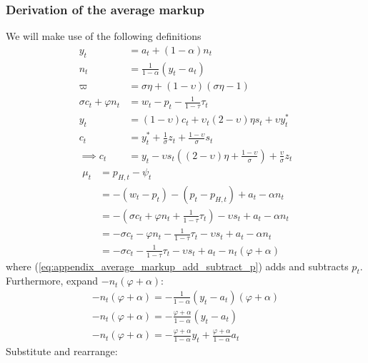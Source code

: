 \subsubsection*{Derivation of the average markup}
We will make use of the following definitions
\begin{align}\label{eq:appendix_average_markup_beginning}
    y_t &= a_t + (1-\alpha)n_t\\
    n_t &= \frac{1}{1-\alpha}(y_t - a_t)\\
    \varpi &= \sigma \eta + (1-\upsilon)(\sigma \eta - 1)\\
    \sigma c_t + \varphi n_t &= w_t - p_t - \frac{1}{1-\tau}\tau_t\\
    y_t &= (1-\upsilon)c_t + \upsilon_t(2-\upsilon)\eta s_t + \upsilon y_t^*\\
    c_t &= y_t^* + \frac{1}{\sigma}z_t + \frac{1-\upsilon}{\sigma}s_t\\
    \implies c_t &= y_t - \upsilon s_t \left( (2-\upsilon)\eta + \frac{1-\upsilon}{\sigma}\right) + \frac{\upsilon}{\sigma}z_t
\end{align}
\begin{align}
    \mu_t &= p_{H,t} - \psi_t\\
    &=-(w_t-p_t) - (p_t - p_{H,t}) + a_t - \alpha n_t \label{eq:appendix_average_markup_add_subtract_p}\\
    &= -(\sigma c_t + \varphi n_t + \frac{1}{1-\tau}\tau_t) - \upsilon s_t + a_t - \alpha n_t\\
    &= -\sigma c_t - \varphi n_t - \frac{1}{1-\tau}\tau_t - \upsilon s_t + a_t - \alpha n_t\\
    &= -\sigma c_t - \frac{1}{1-\tau}\tau_t - \upsilon s_t + a_t - n_t(\varphi + \alpha)
\end{align}
where (\ref{eq:appendix_average_markup_add_subtract_p}) adds and subtracts $p_t$. Furthermore, expand $-n_t(\varphi + \alpha)$:
\begin{align}
    -n_t(\varphi + \alpha) = -\frac{1}{1-\alpha}(y_t - a_t)(\varphi + \alpha)\\
    -n_t(\varphi + \alpha) = -\frac{\varphi + \alpha}{1-\alpha}(y_t - a_t)\\
    -n_t(\varphi + \alpha) = -\frac{\varphi + \alpha}{1-\alpha}y_t + \frac{\varphi + \alpha}{1-\alpha}a_t
\end{align}
Substitute and rearrange:
